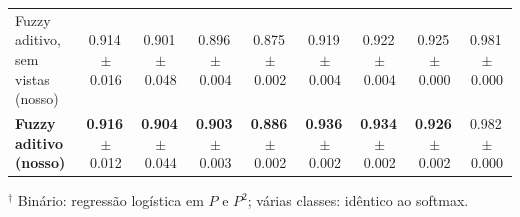 \begin{table}[t]
{\begin{tabular}{lcccccccc}
  \midrule
  Fuzzy aditivo, sem vistas (nosso) & 0.914\,{\scriptsize$\pm$0.016} & 0.901\,{\scriptsize$\pm$0.048} & 0.896\,{\scriptsize$\pm$0.004} & 0.875\,{\scriptsize$\pm$0.002} & 0.919\,{\scriptsize$\pm$0.004} & 0.922\,{\scriptsize$\pm$0.004} & 0.925\,{\scriptsize$\pm$0.000} & 0.981\,{\scriptsize$\pm$0.000} \\
  \textbf{Fuzzy aditivo (nosso)} & \textbf{0.916}\,{\scriptsize$\pm$0.012} & \textbf{0.904}\,{\scriptsize$\pm$0.044} & \textbf{0.903}\,{\scriptsize$\pm$0.003} & \textbf{0.886}\,{\scriptsize$\pm$0.002} & \textbf{0.936}\,{\scriptsize$\pm$0.002} & \textbf{0.934}\,{\scriptsize$\pm$0.002} & \textbf{0.926}\,{\scriptsize$\pm$0.002} & 0.982\,{\scriptsize$\pm$0.000} \\
  \bottomrule
\end{tabular}}

\vspace{2pt}
{\footnotesize $^\dagger$ Binário: regressão logística em $P$ e $P^2$; várias classes: idêntico ao softmax.}
\end{table}

